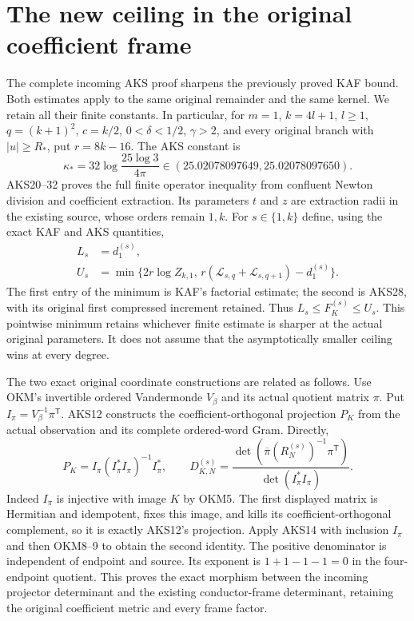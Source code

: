 \documentclass[11pt,a4paper]{article}
\begin{document}
\section{The new ceiling in the original coefficient frame}
\label{sec:AKJ}
The complete incoming AKS proof sharpens the previously proved KAF bound.
Both estimates apply to the same original remainder and the same kernel.
We retain all their finite constants. In particular, for $m=1$,
$k=4l+1$, $l\ge1$, $q=(k+1)^2$, $c=k/2$, $0<\delta<1/2$,
$\gamma>2$, and every original branch with $|u|\ge R_*$, put
$r=8k-16$. The AKS constant is
\[
 \kappa_*=32\log\frac{25\log3}{4\pi}
 \in(25.02078097649,25.02078097650).
 \tag{AKJ1}
\]
AKS20--32 proves the full finite operator inequality from confluent
Newton division and coefficient extraction. Its parameters $t$ and $z$
are extraction radii in the existing source, whose orders remain $1,k$.
For $s\in\{1,k\}$ define, using the exact KAF and AKS quantities,
\[
 \begin{split}
 L_s&=d_1^{(s)},\\
 U_s&=\min\{2r\log Z_{k,1},\,
 r(\mathcal L_{s,q}+\mathcal L_{s,q+1})-d_1^{(s)}\}.
 \end{split}\tag{AKJ2}
\]
The first entry of the minimum is KAF's factorial estimate; the second
is AKS28, with its original first compressed increment retained. Thus
$L_s\le F_K^{(s)}\le U_s$. This pointwise minimum retains whichever
finite estimate is sharper at the actual original parameters. It does
not assume that the asymptotically smaller ceiling wins at every degree.

The two exact original coordinate constructions are related as follows.
Use OKM's invertible ordered Vandermonde $V_\beta$ and its actual
quotient matrix $\pi$. Put $I_\pi=V_\beta^{-1}\pi^{\mathsf T}$.
AKS12 constructs the coefficient-orthogonal projection $P_K$ from the
actual observation and its complete ordered-word Gram. Directly,
\[
 P_K=I_\pi(I_\pi^*I_\pi)^{-1}I_\pi^*,\qquad
 D_{K,N}^{(s)}
 =\frac{\det(\overline\pi(R_N^{(s)})^{-1}\pi^{\mathsf T})}
        {\det(I_\pi^*I_\pi)}.
 \tag{AKJ3}
\]
Indeed $I_\pi$ is injective with image $K$ by OKM5. The first displayed
matrix is Hermitian and idempotent, fixes this image, and kills its
coefficient-orthogonal complement, so it is exactly AKS12's projection.
Apply AKS14 with inclusion $I_\pi$ and then OKM8--9 to obtain the second
identity. The positive denominator is independent of endpoint and
source. Its exponent is $1+1-1-1=0$ in the four-endpoint quotient.
This proves the exact morphism between the incoming projector
determinant and the existing conductor-frame determinant, retaining the
original coefficient metric and every frame factor.
\end{document}

